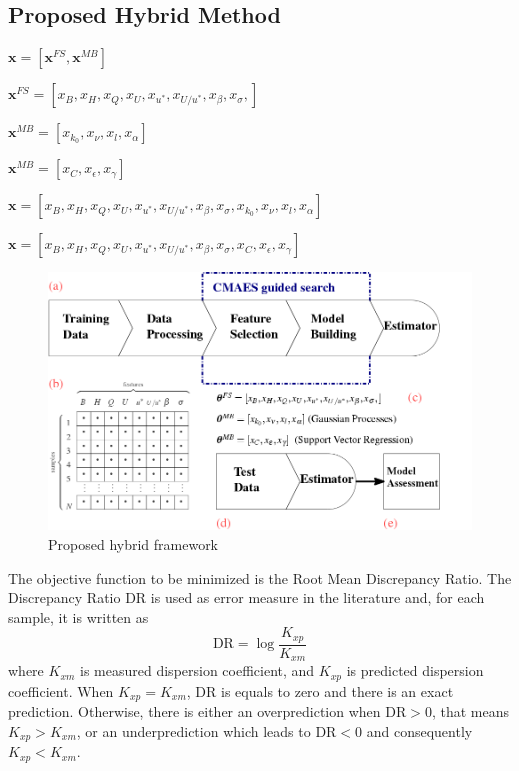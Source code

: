 \documentclass[a4paper,12pt, english]{article}
\newcommand{\x}{\mathbf{x}}
\begin{document}
\subsection{\label{sec:methods:evofs} Proposed Hybrid Method}


$\x = [ \x^{FS},  \x^{MB} ]$

$\x^{FS} = [ x_{B}, x_{H}, x_{Q}, x_{U}, x_{u^*}, x_{U/u^*}, x_{\beta}, x_{\sigma}, ]$

$\x^{MB} = [ x_{k_0}, x_{\nu}, x_{l}, x_{\alpha} ]$


$\x^{MB} = [ x_{C}, x_{\epsilon}, x_{\gamma}] $


$\x = [ x_{B}, x_{H}, x_{Q}, x_{U}, x_{u^*}, x_{U/u^*}, x_{\beta}, x_{\sigma}, x_{k_0}, x_{\nu}, x_{l}, x_{\alpha} ]$

$\x = [ x_{B}, x_{H}, x_{Q}, x_{U}, x_{u^*}, x_{U/u^*}, x_{\beta}, x_{\sigma}, x_{C}, x_{\epsilon}, x_{\gamma}] $


\begin{figure}[!]
 \centering 
 \includegraphics[width=0.85\linewidth]{./framework/ldc_model_scheme}
 \caption{Proposed hybrid framework}
 \label{fig:framework}
\end{figure}


The objective function to be minimized is the  Root Mean Discrepancy Ratio.
The Discrepancy Ratio DR is used as error measure in the literature and, for each sample, it is written as
\begin{equation}
 \label{eq:drc}
 \mbox{DR} = \log{ \frac{K_{xp}}{K_{xm}} }
\end{equation}
%
where
$K_{xm}$ is measured dispersion coefficient, and 
$K_{xp}$ is predicted dispersion coefficient. 
When $K_{xp}=K_{xm}$, DR is equals to zero and there is an exact prediction.
Otherwise,  there is either an overprediction when $\mbox{DR}> 0$, that means  $K_{xp}>K_{xm}$, or an underprediction which leads to $\mbox{DR} < 0$ and consequently  $K_{xp}<K_{xm}$. 
\end{document}
